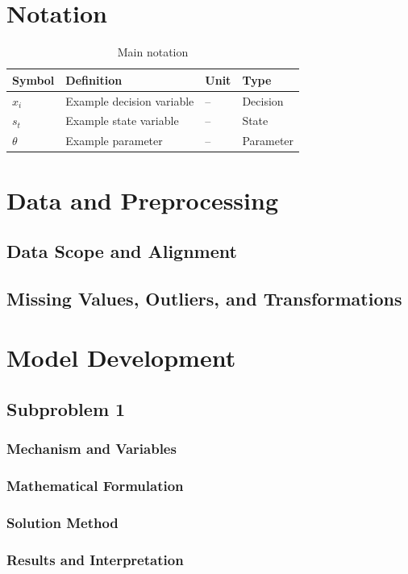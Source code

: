\documentclass[11pt,letterpaper]{article}
\begin{document}
\section{Notation}
\begin{table}[H]
\centering
\caption{Main notation}
\label{tab:notation}
\begin{tabular}{llll}
\toprule
Symbol & Definition & Unit & Type \\
\midrule
$x_i$ & Example decision variable & -- & Decision \\
$s_t$ & Example state variable & -- & State \\
$\theta$ & Example parameter & -- & Parameter \\
\bottomrule
\end{tabular}
\end{table}

\section{Data and Preprocessing}
\subsection{Data Scope and Alignment}
\subsection{Missing Values, Outliers, and Transformations}

\section{Model Development}
\subsection{Subproblem 1}
\subsubsection{Mechanism and Variables}
\subsubsection{Mathematical Formulation}
\subsubsection{Solution Method}
\subsubsection{Results and Interpretation}
\end{document}
